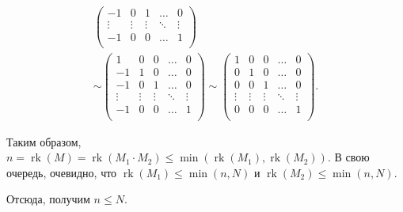 \begin{solution}
\begin{gather*}
\begin {pmatrix}
    	-1& 0& 1& \ldots& 0 \\
    	\vdots& \vdots& \vdots& \ddots& \vdots \\
    	-1& 0& 0& \ldots& 1 \\
    \end {pmatrix} 
\\
  \sim  \begin {pmatrix}
    	1& 0& 0& \ldots& 0 \\
    	-1& 1& 0& \ldots& 0 \\
    	-1& 0& 1& \ldots& 0 \\
    	\vdots& \vdots& \vdots& \ddots& \vdots \\
    	-1& 0& 0& \ldots& 1 \\
    \end {pmatrix} \sim
    \begin {pmatrix}
    	1& 0& 0& \ldots& 0 \\
    	0& 1& 0& \ldots& 0 \\
    	0& 0& 1& \ldots& 0 \\
    	\vdots& \vdots& \vdots& \ddots& \vdots \\
    	0& 0& 0& \ldots& 1 \\
    \end {pmatrix}.
\end{gather*}

\par
Таким образом, $n = \operatorname{rk}(M) = \operatorname{rk}(M_1 \cdot M_2) \leq \min(\operatorname{rk}(M_1), \operatorname{rk}(M_2))$.
В свою очередь, очевидно, что $\operatorname{rk}(M_1) \leq \min(n, N)$ и $\operatorname{rk}(M_2) \leq \min(n, N)$.\par
Отсюда, получим $n \leq N$.

\end{solution}